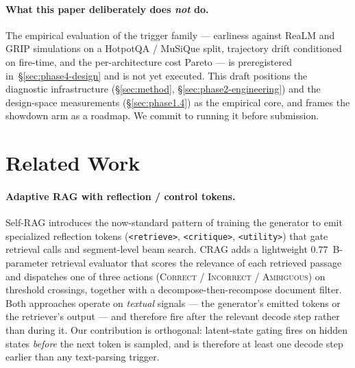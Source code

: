 \documentclass[11pt,letterpaper]{article}
\begin{document}
\paragraph{What this paper deliberately does \emph{not} do.}
The empirical evaluation of the trigger family — earliness against
ReaLM and GRIP simulations on a HotpotQA / MuSiQue split, trajectory
drift conditioned on fire-time, and the per-architecture cost Pareto —
is preregistered in~\S\ref{sec:phase4-design} and is not yet executed.
This draft positions the diagnostic infrastructure (\S\ref{sec:method},
\S\ref{sec:phase2-engineering}) and the design-space measurements
(\S\ref{sec:phase1.4}) as the empirical core, and frames the showdown
arm as a roadmap. We commit to running it before submission.

\section{Related Work}
\label{sec:related}

\paragraph{Adaptive RAG with reflection / control tokens.}
Self-RAG \citep{TODO:SelfRAG} introduces the now-standard pattern of
training the generator to emit specialized reflection tokens
(\verb|<retrieve>|, \verb|<critique>|, \verb|<utility>|) that gate
retrieval calls and segment-level beam search. CRAG \citep{TODO:CRAG}
adds a lightweight $0.77$~B-parameter retrieval evaluator that scores
the relevance of each retrieved passage and dispatches one of three
actions (\textsc{Correct} / \textsc{Incorrect} / \textsc{Ambiguous}) on
threshold crossings, together with a decompose-then-recompose document
filter. Both approaches operate on \emph{textual} signals — the
generator's emitted tokens or the retriever's output — and therefore
fire after the relevant decode step rather than during it. Our
contribution is orthogonal: latent-state gating fires on hidden states
\emph{before} the next token is sampled, and is therefore at least one
decode step earlier than any text-parsing trigger.
\end{document}
